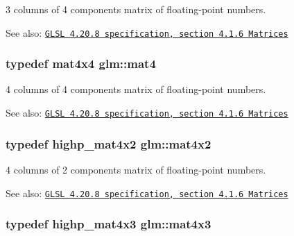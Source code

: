 3 columns of 4 components matrix of floating-point numbers.

\begin{Desc}
\item[See also:]\href{http://www.opengl.org/registry/doc/GLSLangSpec.4.20.8.pdf}{\tt GLSL 4.20.8 specification, section 4.1.6 Matrices} \end{Desc}
\hypertarget{group__core__types_g7dcd2365c2e368e6af5b7adeb6a9c8df}{
\subsubsection[mat4]{\setlength{\rightskip}{0pt plus 5cm}typedef mat4x4 {\bf glm::mat4}}}
\label{group__core__types_g7dcd2365c2e368e6af5b7adeb6a9c8df}


4 columns of 4 components matrix of floating-point numbers.

\begin{Desc}
\item[See also:]\href{http://www.opengl.org/registry/doc/GLSLangSpec.4.20.8.pdf}{\tt GLSL 4.20.8 specification, section 4.1.6 Matrices} \end{Desc}
\hypertarget{group__core__types_g72cf8ec4f4cda85943f4683531e421bc}{
\subsubsection[mat4x2]{\setlength{\rightskip}{0pt plus 5cm}typedef highp\_\-mat4x2 {\bf glm::mat4x2}}}
\label{group__core__types_g72cf8ec4f4cda85943f4683531e421bc}


4 columns of 2 components matrix of floating-point numbers.

\begin{Desc}
\item[See also:]\href{http://www.opengl.org/registry/doc/GLSLangSpec.4.20.8.pdf}{\tt GLSL 4.20.8 specification, section 4.1.6 Matrices} \end{Desc}
\hypertarget{group__core__types_gd3f3f750dcdc74a9037342c5cae55f5e}{
\subsubsection[mat4x3]{\setlength{\rightskip}{0pt plus 5cm}typedef highp\_\-mat4x3 {\bf glm::mat4x3}}}
\label{group__core__types_gd3f3f750dcdc74a9037342c5cae55f5e}


